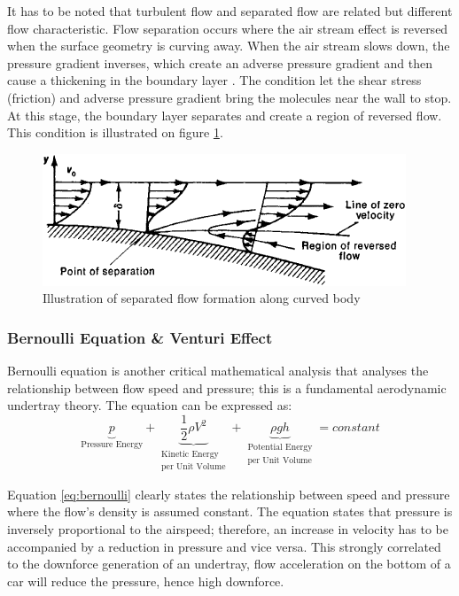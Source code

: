 \noindent It has to be noted that turbulent flow and separated flow are related but different flow characteristic. Flow separation occurs where the air stream effect is reversed when the surface geometry is curving away. When the air stream slows down, the pressure gradient inverses, which create an adverse pressure gradient and then cause a thickening in the boundary layer \cite{Scibor-Rylski1984RoadAerodynamics}. The condition let the shear stress (friction) and adverse pressure gradient bring the molecules near the wall to stop. At this stage, the boundary layer separates and create a region of reversed flow. This condition is illustrated on figure \ref{fig:flow separation}.

\begin{figure}[!ht]
    \centering
    \includegraphics[scale= 0.8]{Figures/flow_separation.png}
    \caption{Illustration of separated flow formation along curved body \cite{Anonymous1979SeparationDictionary}}
    \label{fig:flow separation}
\end{figure}

\subsubsection{Bernoulli Equation \& Venturi Effect}
Bernoulli equation is another critical mathematical analysis that analyses the relationship between flow speed and pressure; this is a fundamental aerodynamic undertray theory. The equation can be expressed as:
\begin{equation}
   \underbrace{p}_\textrm{Pressure Energy} + \underbrace{\frac{1}{2} \rho V^{2}}_{\substack{\text{Kinetic Energy} \\ \text{per Unit Volume}}} + \underbrace{\rho g h}_{\substack{\text{Potential Energy} \\ \text{per Unit Volume}}} = constant
    \label{eq:bernoulli}
\end{equation}

Equation \ref{eq:bernoulli} clearly states the relationship between speed and pressure where the flow's density is assumed constant. The equation states that pressure is inversely proportional to the airspeed; therefore, an increase in velocity has to be accompanied by a reduction in pressure and vice versa. This strongly correlated to the downforce generation of an undertray, flow acceleration on the bottom of a car will reduce the pressure, hence high downforce.

